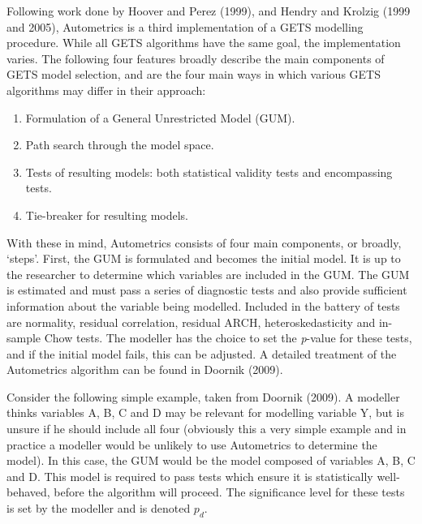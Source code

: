 Following work done by Hoover and Perez (1999), and Hendry and Krolzig (1999 and 2005), Autometrics is a third implementation of a GETS modelling procedure. While all GETS algorithms have the same goal, the implementation varies. The following four features broadly describe the main components of GETS model selection, and are the four main ways in which various GETS algorithms may differ in their approach:
\begin{enumerate}
\item Formulation of a General Unrestricted Model (GUM).
\item Path search through the model space.
\item Tests of resulting models: both statistical validity tests and encompassing tests.
\item Tie-breaker for resulting models.
\end{enumerate}
With these in mind, Autometrics consists of four main components, or broadly, `steps'. First, the GUM is formulated and becomes the initial model. It is up to the researcher to determine which variables are included in the GUM. The GUM is estimated and must pass a series of diagnostic tests and also provide sufficient information about the variable being modelled. Included in the battery of tests are normality, residual correlation, residual ARCH, heteroskedasticity and in-sample Chow tests. The modeller has the choice to set the \textit{p}-value for these tests, and if the initial model fails, this can be adjusted. A detailed treatment of the Autometrics algorithm can be found in Doornik (2009). 

Consider the following simple example, taken from Doornik (2009). A modeller thinks variables A, B, C and D may be relevant for modelling variable Y, but is unsure if he should include all four (obviously this a very simple example and in practice a modeller would be unlikely to use Autometrics to determine the model). In this case, the GUM would be the model composed of variables A, B, C and D. This model is required to pass tests which ensure it is statistically well-behaved, before the algorithm will proceed. The significance level for these tests is set by the modeller and is denoted $p_{d}$. 

